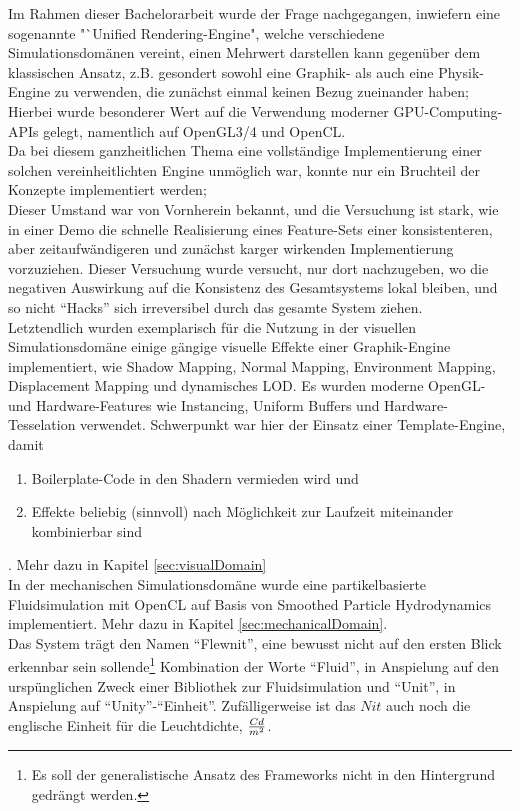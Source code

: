 

Im Rahmen dieser Bachelorarbeit wurde der Frage nachgegangen, inwiefern eine sogenannte "`Unified Rendering-Engine", welche verschiedene Simulationsdomänen vereint, einen Mehrwert darstellen kann gegenüber dem klassischen Ansatz, z.B. gesondert sowohl eine Graphik- als auch eine Physik-Engine zu verwenden, die zunächst einmal keinen
Bezug zueinander haben;\\

Hierbei wurde besonderer Wert auf die Verwendung moderner GPU-Computing-APIs gelegt, namentlich auf OpenGL3/4 und OpenCL.\\
Da bei diesem ganzheitlichen Thema eine vollständige Implementierung einer solchen vereinheitlichten Engine unmöglich war,
konnte nur ein Bruchteil der Konzepte implementiert werden;\\

Dieser Umstand war von Vornherein bekannt, und die Versuchung ist stark, wie in einer Demo die schnelle Realisierung eines Feature-Sets einer konsistenteren, aber zeitaufwändigeren und zunächst karger wirkenden Implementierung vorzuziehen.
Dieser Versuchung wurde versucht, nur dort nachzugeben, wo die negativen Auswirkung auf die Konsistenz des Gesamtsystems lokal bleiben, und so nicht "`Hacks"' sich irreversibel durch das gesamte System ziehen.\\

Letztendlich wurden exemplarisch für die Nutzung in  der visuellen Simulationsdomäne einige gängige visuelle Effekte einer Graphik-Engine implementiert, wie  Shadow Mapping, Normal Mapping, Environment Mapping, Displacement Mapping und dynamisches LOD. Es wurden moderne OpenGL- und Hardware-Features wie Instancing, Uniform Buffers und Hardware-Tesselation verwendet. Schwerpunkt war hier der Einsatz einer Template-Engine, damit
\begin{enumerate}
	\item Boilerplate-Code in den Shadern vermieden wird und
	\item Effekte beliebig (sinnvoll) nach Möglichkeit zur Laufzeit miteinander kombinierbar sind
\end{enumerate}
. Mehr dazu in Kapitel \ref{sec:visualDomain}\\
In der mechanischen Simulationsdomäne wurde eine partikelbasierte Fluidsimulation mit OpenCL auf Basis von Smoothed Particle Hydrodynamics implementiert. Mehr dazu in Kapitel \ref{sec:mechanicalDomain}.\\

Das System trägt den Namen "`Flewnit"', eine bewusst nicht auf den ersten Blick erkennbar sein sollende\footnote{Es soll der generalistische Ansatz des Frameworks nicht in den Hintergrund gedrängt werden.} Kombination der Worte "`Fluid"', in Anspielung auf den urspünglichen Zweck einer Bibliothek zur Fluidsimulation und "`Unit"', in Anspielung auf "`Unity"'-"`Einheit"'. Zufälligerweise ist das $Nit$ auch noch die englische Einheit für die Leuchtdichte, $Cd \over m^2$.


